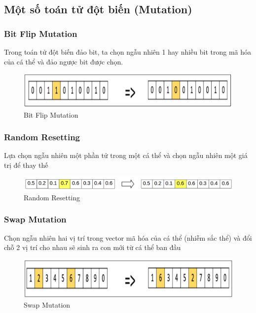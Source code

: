 \documentclass[a4paper,12pt]{report}
\begin{document}
\subsection{Một số toán tử đột biến (Mutation)}
\subsubsection{Bit Flip Mutation}
Trong toán tử đột biến đảo bit, ta chọn ngẫu nhiên 1 hay nhiều bit trong mã hóa của cá thể và đảo ngược bit được chọn.
\begin{figure}[H]
\centering
\includegraphics[scale=0.4]{bit_flip_mutation.png}
\caption{Bit Flip Mutation}
\end{figure}
 
\subsubsection{Random Resetting}
Lựa chọn ngẫu nhiên một phần tử trong một cá thể và chọn ngẫu nhiên một giá trị để thay thế
\begin{figure}[H]
\centering
\includegraphics[scale=0.4]{random_resetting.png}
\caption{Random Resetting}
\end{figure}

\subsubsection{Swap Mutation}
Chọn ngẫu nhiên hai vị trí trong vector mã hóa của cá thể (nhiễm sắc thể) và đổi chỗ 2 vị trí cho nhau sẽ sinh ra con mới từ cá thể ban đầu
\begin{figure}[H]
\centering 
\includegraphics[scale=0.4]{swap_mutation.png}
\caption{Swap Mutation}
\end{figure}
\end{document}

